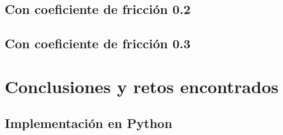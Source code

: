 \documentclass[sigconf,authorversion,nonacm]{acmart}
\begin{document}
\subsection{Con coeficiente de fricción 0.2}

\subsection{Con coeficiente de fricción 0.3}


\section{Conclusiones y retos encontrados}





\clearpage

\appendix

\begin{figure*}
  \section{Implementación en Python}
  \label{app:py}
  \inputminted[lastline=44]{python}{/home/mario/git/MarioJim/PracticasInteligenciaComp/6_LogicaDifusa/A01173359_A01252642_T6.py}
\end{figure*}

\end{document}

